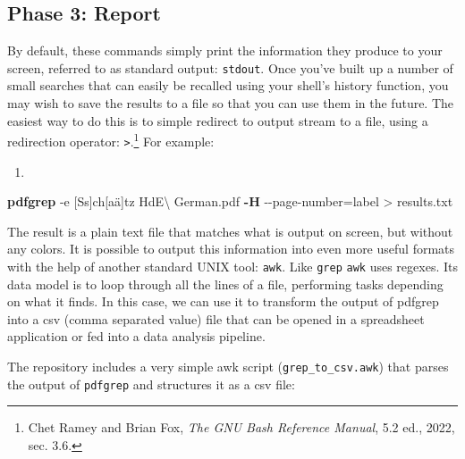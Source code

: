 \documentclass[
  letterpaper,
]{tufte-handout}
\newenvironment{Shaded}{\begin{snugshade}}{\end{snugshade}}
\newcommand{\AttributeTok}[1]{\textcolor[rgb]{0.00,0.34,0.68}{#1}}
\newcommand{\DataTypeTok}[1]{\textcolor[rgb]{0.00,0.34,0.68}{#1}}
\newcommand{\ExtensionTok}[1]{\textcolor[rgb]{0.00,0.58,1.00}{\textbf{#1}}}
\newcommand{\NormalTok}[1]{\textcolor[rgb]{0.12,0.11,0.11}{#1}}
\newcommand{\OperatorTok}[1]{\textcolor[rgb]{0.12,0.11,0.11}{#1}}
\newcommand{\StringTok}[1]{\textcolor[rgb]{0.75,0.01,0.01}{#1}}
\providecommand{\tightlist}{%
  \setlength{\itemsep}{0pt}\setlength{\parskip}{0pt}}
\begin{document}
\subsection{Phase 3: Report}\label{phase-3-report}

By default, these commands simply print the information they produce to
your screen, referred to as standard output: \texttt{stdout}. Once
you've built up a number of small searches that can easily be recalled
using your shell's history function, you may wish to save the results to
a file so that you can use them in the future. The easiest way to do
this is to simple redirect to output stream to a file, using a
redirection operator: \texttt{\textgreater{}}.\footnote{Chet Ramey and
  Brian Fox, \emph{The GNU Bash Reference Manual}, 5.2 ed., 2022, sec.
  3.6.} For example:

\begin{enumerate}
\def\labelenumi{(\arabic{enumi})}
\setcounter{enumi}{7}
\tightlist
\item
\end{enumerate}

\begin{Shaded}
\begin{Highlighting}[]
\ExtensionTok{pdfgrep} \AttributeTok{{-}e} \StringTok{\textquotesingle{}[Ss]ch[aä]tz\textquotesingle{}}\NormalTok{ HdE}\DataTypeTok{\textbackslash{} }\NormalTok{German.pdf }
\ExtensionTok{{-}H} \AttributeTok{{-}{-}page{-}number}\OperatorTok{=}\NormalTok{label }\OperatorTok{\textgreater{}}\NormalTok{ results.txt}
\end{Highlighting}
\end{Shaded}

The result is a plain text file that matches what is output on screen,
but without any colors. It is possible to output this information into
even more useful formats with the help of another standard UNIX tool:
\texttt{awk}. Like \texttt{grep} \texttt{awk} uses regexes. Its data
model is to loop through all the lines of a file, performing tasks
depending on what it finds. In this case, we can use it to transform the
output of pdfgrep into a csv (comma separated value) file that can be
opened in a spreadsheet application or fed into a data analysis
pipeline.

The repository includes a very simple awk script
(\texttt{grep\_to\_csv.awk}) that parses the output of \texttt{pdfgrep}
and structures it as a csv file:
\end{document}
